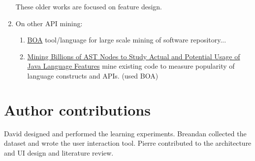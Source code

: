 \documentclass{article}
\begin{document}
\begin{multicols}{2}
\begin{enumerate}
\begin{enumerate}
          \end{enumerate}
    These older works are focused on feature design.
    \item On other API mining:
        \begin{enumerate}
            \item \href{http://web.cs.iastate.edu/~design/papers/ICSE-13/icse13.pdf}{BOA} tool/language for large scale mining of software repository... \item \href{http://design.cs.iastate.edu/papers/ICSE-14/icse14.pdf}{Mining Billions of AST Nodes to Study Actual and Potential Usage of Java Language Features} mine existing code to measure popularity of language constructs and APIs. (used BOA)
        \end{enumerate}
\end{enumerate}

\section{Author contributions} %

David designed and performed the learning experiments. Breandan collected the dataset and wrote the user interaction tool. Pierre contributed to the architecture and UI design and literature review.

\printbibliography

\end{multicols}
\end{document}

